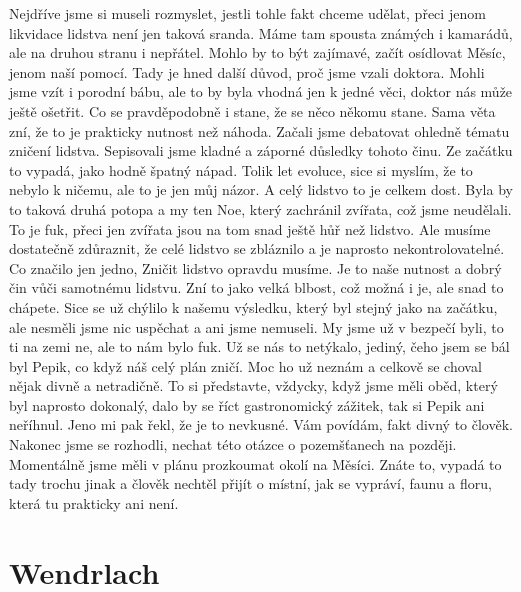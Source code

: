 Nejdříve jsme si museli rozmyslet, jestli tohle fakt chceme udělat, přeci jenom likvidace lidstva není jen taková sranda. Máme tam spousta známých i kamarádů, ale na druhou stranu i nepřátel. Mohlo by to být zajímavé, začít osídlovat Měsíc, jenom naší pomocí. Tady je hned další důvod, proč jsme vzali doktora. Mohli jsme vzít i porodní bábu, ale to by byla vhodná jen k jedné věci, doktor nás může ještě ošetřit. Co se pravděpodobně i stane, že se něco někomu stane. Sama věta zní, že to je prakticky nutnost než náhoda. Začali jsme debatovat ohledně tématu zničení lidstva. Sepisovali jsme kladné a záporné důsledky tohoto činu. Ze začátku to vypadá, jako hodně špatný nápad. Tolik let evoluce, sice si myslím, že to nebylo k ničemu, ale to je jen můj názor. A celý lidstvo to je celkem dost. Byla by to taková druhá potopa a my ten Noe, který zachránil zvířata, což jsme neudělali. To je fuk, přeci jen zvířata jsou na tom snad ještě hůř než lidstvo. Ale musíme dostatečně zdůraznit, že celé lidstvo se zbláznilo a je naprosto nekontrolovatelné. Co značilo jen jedno, Zničit lidstvo opravdu musíme. Je to naše nutnost a dobrý čin vůči samotnému lidstvu. Zní to jako velká blbost, což možná i je, ale snad to chápete. Sice se už chýlilo k našemu výsledku, který byl stejný jako na začátku, ale nesměli jsme nic uspěchat a ani jsme nemuseli. My jsme už v bezpečí byli, to ti na zemi ne, ale to nám bylo fuk. Už se nás to netýkalo, jediný, čeho jsem se bál byl Pepik, co když náš celý plán zničí. Moc ho už neznám a celkově se choval nějak divně a netradičně. To si představte, vždycky, když jsme měli oběd, který byl naprosto dokonalý, dalo by se říct gastronomický zážitek, tak si Pepik ani neříhnul. Jeno mi pak řekl, že je to nevkusné. Vám povídám, fakt divný to člověk. Nakonec jsme se rozhodli, nechat této otázce o pozemšťanech na později. Momentálně jsme měli v plánu prozkoumat okolí na Měsíci. Znáte to, vypadá to tady trochu jinak a člověk nechtěl přijít o místní, jak se vypráví, faunu a floru, která tu prakticky ani není.

\section{Wendrlach}

